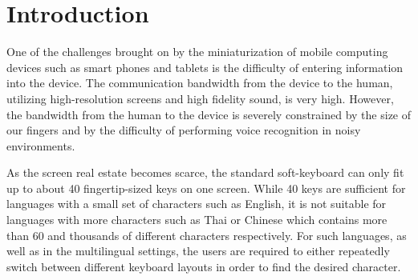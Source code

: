 \documentclass{sigchi}
\begin{document}



\newtheorem{theorem}{Theorem}   
\newtheorem{lemma}[theorem]{Lemma}

\section{Introduction}

One of the challenges brought on by the miniaturization of mobile
computing devices such as smart phones and tablets is the difficulty of
entering information into the device. The communication bandwidth from
the device to the human, utilizing high-resolution screens and high
fidelity sound, is very high. However, the bandwidth from the human to
the device is severely constrained by the size of our fingers and by
the difficulty of performing voice recognition in noisy environments.

As the screen real estate becomes scarce, the standard soft-keyboard
can only fit up to about 40 fingertip-sized keys on one screen. While
40 keys are sufficient for languages with a small set of characters
such as English, it is not suitable for languages with more characters
such as Thai or Chinese which contains more than 60 and thousands of
different characters respectively. For such languages, as well as in
the multilingual settings, the users are required to either repeatedly
switch between different keyboard layouts in order to find the desired
character.
\end{document}
